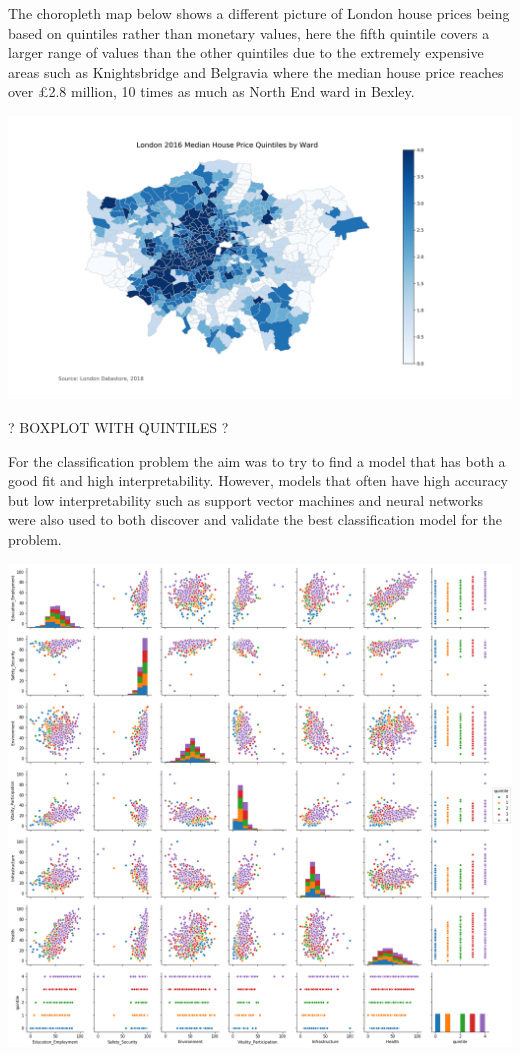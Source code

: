 The choropleth map below shows a different picture of London house prices being based on quintiles rather than monetary values, here the fifth quintile covers a larger range of values than the other quintiles due to the extremely expensive areas such as Knightsbridge and Belgravia where the median house price reaches over £2.8 million, 10 times as much as North End ward in Bexley.

\includegraphics[scale=0.4]{figures/HPQuintile} %

? BOXPLOT WITH QUINTILES ?

For the classification problem the aim was to try to find a model that has both a good fit and high interpretability. However, models that often have high accuracy but low interpretability such as support vector machines and neural networks were also used to both discover and validate the best classification model for the problem.

\includegraphics[scale=0.3]{figures/pairplot_quintile} %

